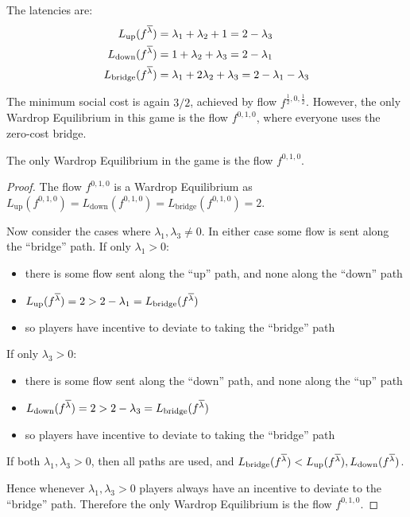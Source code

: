 The latencies are:
\begin{equation*}
	\begin{split}
		L_\text{up}(f^{\overline{\lambda}}) & = \lambda_1 + \lambda_2 + 1 =
		2 - \lambda_3 \\
		L_\text{down}(f^{\overline{\lambda}}) & = 1 + \lambda_2 + \lambda_3 = 2 -
		\lambda_1 \\
		L_\text{bridge}(f^{\overline{\lambda}}) & = \lambda_1 + 2\lambda_2 +
		\lambda_3 = 2 - \lambda_1 - \lambda_3
	\end{split}
\end{equation*}

The minimum social cost is again $3/2$, achieved by flow $f^{\frac{1}{2}, 0,
\frac{1}{2}}$. However, the only Wardrop Equilibrium in this game is the flow
$f^{0,1,0}$, where everyone uses the zero-cost bridge.

\begin{claim}
	The only Wardrop Equilibrium in the game is the flow $f^{0,1,0}$.
\end{claim}
\begin{proof}
	The flow $f^{0,1,0}$ is a Wardrop Equilibrium as $L_\text{up}(f^{0,1,0}) =
	L_\text{down}(f^{0,1,0}) = L_\text{bridge}(f^{0,1,0}) = 2$.

	Now consider the cases where $\lambda_1, \lambda_3 \neq 0$. In either case
	some flow is sent along the ``bridge'' path. If only $\lambda_1 > 0$:
	\begin{itemize}
		\item there is some flow sent along the ``up'' path, and none along the
			``down'' path
		\item $L_\text{up}(f^{\overline{\lambda}}) = 2 > 2 - \lambda_1 =
			L_\text{bridge}(f^{\overline{\lambda}})$
		\item so players have incentive to deviate to taking the ``bridge''
			path
	\end{itemize}

	If only $\lambda_3 > 0$:
	\begin{itemize}
		\item there is some flow sent along the ``down'' path, and none along the
			``up'' path
		\item $L_\text{down}(f^{\overline{\lambda}}) = 2 > 2 - \lambda_3 =
			L_\text{bridge}(f^{\overline{\lambda}})$
		\item so players have incentive to deviate to taking the ``bridge''
			path
	\end{itemize}

	If both $\lambda_1, \lambda_3 > 0$, then all paths are used, and
	$L_\text{bridge}(f^{\overline{\lambda}}) < L_\text{up}(f^{\overline{\lambda}}),
	L_\text{down}(f^{\overline{\lambda}})$.

	Hence whenever $\lambda_1, \lambda_3 > 0$ players always have an incentive
	to deviate to the ``bridge'' path. Therefore the only Wardrop Equilibrium
	is the flow $f^{0,1,0}$.

\end{proof}

